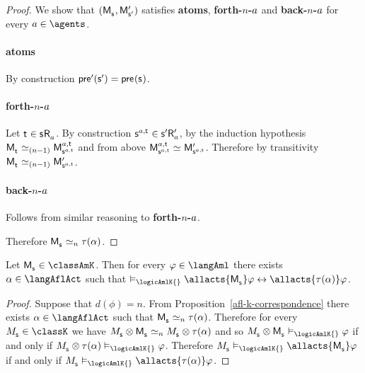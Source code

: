 \begin{proof}
We show that $(\aPModel{\aStateS}, \aPModelP{\aStateSP})$ satisfies {\bf atoms}, {\bf forth-$n$-$a$} and {\bf back-$n$-$a$} for every $\agentA \in \agents$.

\paragraph{atoms} By construction
$\aPreconditionP(\aStateSP) = \aPrecondition(\aStateS)$.

\paragraph{forth-$n$-$a$} 
Let $\aStateT \in \aStateS \aAccessibility{\agentA}$.
By construction $\aStateS[\agentA,\aStateT] \in \aStateSP \aAccessibilityP{\agentA}$, by the induction hypothesis $\aPModel{\aStateT} \bisimilar[(n - 1)] \aPModel[\agentA,\aStateT]{\aStateS[\agentA,\aStateT]}$ and from above $\aPModel[\agentA,\aStateT]{\aStateS[\agentA,\aStateT]} \bisimilar \aPModelP{\aStateS[\agentA,\aStateT]}$.
Therefore by transitivity $\aPModel{\aStateT} \bisimilar[(n - 1)] \aPModelP{\aStateS[\agentA,\aStateT]}$.

\paragraph{back-$n$-$a$} Follows from similar reasoning to {\bf forth-$n$-$a$}.

Therefore $\aPModel{\aStateS} \bisimilar[n] \tau(\alpha)$.
\end{proof}

\begin{corollary}\label{afl-k-correspondence-aml-allacts}
Let $\aPModel{\aStateS} \in \classAmK$.
Then for every $\phi \in \langAml$ there exists $\alpha \in \langAflAct$ such that $\entails_\logicAmlK{} \allacts{\aPModel{\aStateS}} \phi \iff \allacts{\tau(\alpha)} \phi$.
\end{corollary}

\begin{proof}
Suppose that $d(\phi) = n$.
From Proposition~\ref{afl-k-correspondence} there exists $\alpha \in \langAflAct$ such that $\aPModel{\aStateS} \bisimilar[n] \tau(\alpha)$.
Therefore for every $\kPModel{\aStateS} \in \classK$ we have $\kPModel{\aStateS} \exec \aPModel{\aStateS} \bisimilar[n] \kPModel{\aStateS} \exec \tau(\alpha)$ and so $\kPModel{\aStateS} \exec \aPModel{\aStateS} \entails_\logicAmlK{} \phi$ if and only if $\kPModel{\aStateS} \exec \tau(\alpha) \entails_\logicAmlK{} \phi$.
Therefore $\kPModel{\aStateS} \entails_\logicAmlK{} \allacts{\aPModel{\aStateS}}  \phi$ if and only if $\kPModel{\aStateS} \entails_\logicAmlK{} \allacts{\tau(\alpha)}  \phi$.
\end{proof}

